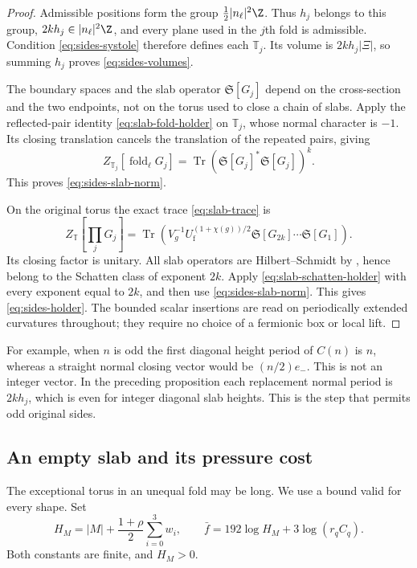 \begin{proof}
Admissible positions form the group
$\frac12|n_\ell|^2\Z$. Thus $h_j$ belongs to this group,
$2kh_j\in|n_\ell|^2\Z$, and every plane used in the $j$th fold
is admissible. Condition \eqref{eq:sides-systole} therefore defines
each $\mathbb T_j$. Its volume is $2kh_j|\Xi|$, so summing
$h_j$ proves \eqref{eq:sides-volumes}.

The boundary spaces and the slab operator $\mathfrak S[G_j]$ depend
on the cross-section and the two endpoints, not on the torus used
to close a chain of slabs. Apply the reflected-pair identity
\eqref{eq:slab-fold-holder} on $\mathbb T_j$, whose normal character
is $-1$. Its closing translation cancels the translation of the
repeated pairs, giving
\[
 Z_{\mathbb T_j}[\operatorname{fold}_\ell G_j]
   =\operatorname{Tr}
       (\mathfrak S[G_j]^*\mathfrak S[G_j])^k.
\]
This proves \eqref{eq:sides-slab-norm}.

On the original torus the exact trace \eqref{eq:slab-trace} is
\[
 Z_{\mathbb T}\left[\prod_jG_j\right]
  =\operatorname{Tr}\left(
     V_g^{-1}U_{\mathrm f}^{(1+\chi(g))/2}
     \mathfrak S[G_{2k}]\cdots\mathfrak S[G_1]\right).
\]
Its closing factor is unitary. All slab operators are
Hilbert--Schmidt by , hence belong
to the Schatten class of exponent $2k$. Apply
\eqref{eq:slab-schatten-holder} with every exponent equal to $2k$,
and then use \eqref{eq:sides-slab-norm}. This gives
\eqref{eq:sides-holder}. The bounded scalar insertions are read on
periodically extended curvatures throughout; they require no choice
of a fermionic box or local lift.
\end{proof}

For example, when $n$ is odd the first diagonal height period of
$C(n)$ is $n$, whereas a straight normal closing vector would be
$(n/2)e_-$. This is not an integer vector. In the preceding proposition
each replacement normal period is $2kh_j$, which is even for integer
diagonal slab heights. This is the step that permits odd original sides.

\subsection{An empty slab and its pressure cost}\label{sec:empty-slab}

The exceptional torus in an unequal fold may be long. We use a bound
valid for every shape. Set
\begin{equation}\label{eq:sides-constants}
 H_M=|M|+\frac{1+\rho}{2}\sum_{i=0}^3w_i,
 \qquad \bar f=192\log H_M+3\log(r_qC_q).
\end{equation}
Both constants are finite, and $H_M>0$.

